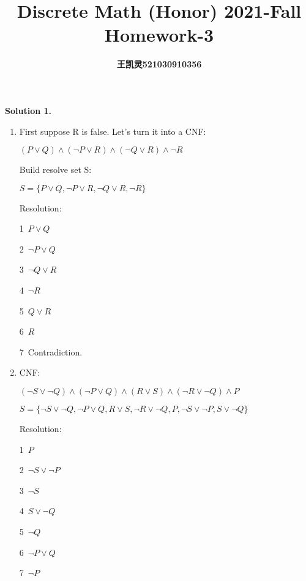 \documentclass[10pt]{article}
\title{\Huge\textbf{Discrete Math (Honor) 2021-Fall Homework-3}}
\author{\cukai\zihao{3}\textbf{王凯灵521030910356}
}
\date{}
\begin{document}
	\maketitle

\noindent\textbf{Solution 1.}
\begin{enumerate}
	\item
	First suppose R is false. Let's turn it into a CNF:

	\centerline {$ (P\vee Q)\wedge (\neg P \vee R)\wedge (\neg Q \vee R)\wedge \neg R$}

	Build resolve set S:

	\centerline {$ S =  \{P\vee Q,\neg P \vee R,\neg Q \vee R, \neg R\} $}

	Resolution:

	\normalsize{\textcircled{\footnotesize{1}}}~$P \vee Q$

	\normalsize{\textcircled{\footnotesize{2}}}~$\neg P \vee Q$

	\normalsize{\textcircled{\footnotesize{3}}}~$\neg Q \vee R$

	\normalsize{\textcircled{\footnotesize{4}}}~$\neg R$

	\normalsize{\textcircled{\footnotesize{5}}}~$Q \vee R$

	\normalsize{\textcircled{\footnotesize{6}}}~$R$

	\normalsize{\textcircled{\footnotesize{7}}}~Contradiction.

	\vspace{-5pt}
	\item
	CNF:

	\centerline{$ (\neg S \vee \neg Q)\wedge (\neg P \vee Q)\wedge (R\vee S)\wedge (\neg R \vee \neg Q)\wedge P$}

	\centerline{$S=\{\neg S \vee \neg Q,\neg P \vee Q,R\vee S,\neg R \vee \neg Q, P,\neg S\vee \neg P,S \vee \neg Q\}$}
	Resolution:

	\normalsize{\textcircled{\footnotesize{1}}}~$P$

	\normalsize{\textcircled{\footnotesize{2}}}~$\neg S \vee \neg P$

	\normalsize{\textcircled{\footnotesize{3}}}~$\neg S$

	\normalsize{\textcircled{\footnotesize{4}}}~$S \vee \neg Q$

	\normalsize{\textcircled{\footnotesize{5}}}~$\neg Q$

	\normalsize{\textcircled{\footnotesize{6}}}~$\neg P \vee Q$

	\normalsize{\textcircled{\footnotesize{7}}}~$\neg P$


\end{enumerate}
\end{document}
